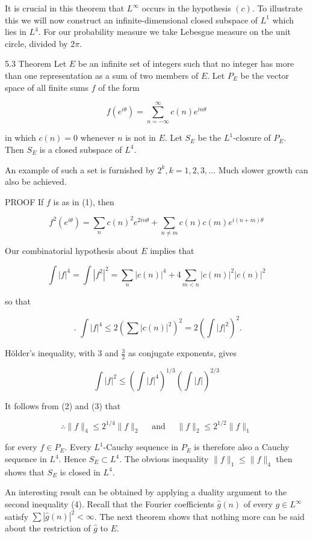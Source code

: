 \documentclass[10pt]{article}
\begin{document}
It is crucial in this theorem that $L^{\infty}$ occurs in the hypothesis $(c)$. To illustrate this we will now construct an infinite-dimensional closed subspace of $L^{1}$ which lies in $L^{4}$. For our probability measure we take Lebesgue measure on the unit circle, divided by $2 \pi$.

5.3 Theorem Let $E$ be an infinite set of integers such that no integer has more than one representation as a sum of two members of $E$. Let $P_{E}$ be the vector space of all finite sums $f$ of the form

$$
f\left(e^{i \theta}\right)=\sum_{n=-\infty}^{\infty} c(n) e^{i n \theta}
$$

in which $c(n)=0$ whenever $n$ is not in $E$. Let $S_{E}$ be the $L^{1}$-closure of $P_{E}$. Then $S_{E}$ is a closed subspace of $L^{4}$.

An example of such a set is furnished by $2^{k}, k=1,2,3, \ldots$ Much slower growth can also be achieved.

PROOF If $f$ is as in (1), then

$$
f^{2}\left(e^{i \theta}\right)=\sum_{n} c(n)^{2} e^{2 i n \theta}+\sum_{n \neq m} c(n) c(m) e^{i(n+m) \theta}
$$

Our combinatorial hypothesis about $E$ implies that

$$
\int|f|^{4}=\int\left|f^{2}\right|^{2}=\sum_{n}|c(n)|^{4}+4 \sum_{m<n}|c(m)|^{2}|c(n)|^{2}
$$

so that

$$
\text { . } \int|f|^{4} \leq 2\left(\sum|c(n)|^{2}\right)^{2}=2\left(\int|f|^{2}\right)^{2} .
$$

Hölder's inequality, with 3 and $\frac{3}{2}$ as conjugate exponents, gives

$$
\int|f|^{2} \leq\left(\int|f|^{4}\right)^{1 / 3}\left(\int|f|\right)^{2 / 3}
$$

It follows from (2) and (3) that

$$
\therefore\|f\|_{4} \leq 2^{1 / 4}\|f\|_{2} \quad \text { and } \quad\|f\|_{2} \leq 2^{1 / 2}\|f\|_{1}
$$

for every $f \in P_{E}$. Every $L^{1}$-Cauchy sequence in $P_{E}$ is therefore also a Cauchy sequence in $L^{4}$. Hence $S_{E} \subset L^{4}$. The obvious inequality $\|f\|_{1} \leq\|f\|_{4}$ then shows that $S_{E}$ is closed in $L^{4}$.

An interesting result can be obtained by applying a duality argument to the second inequality (4). Recall that the Fourier coefficients $\hat{g}(n)$ of every $g \in L^{\infty}$ satisfy $\sum|\hat{g}(n)|^{2}<\infty$. The next theorem shows that nothing more can be said about the restriction of $\hat{g}$ to $E$.
\end{document}
